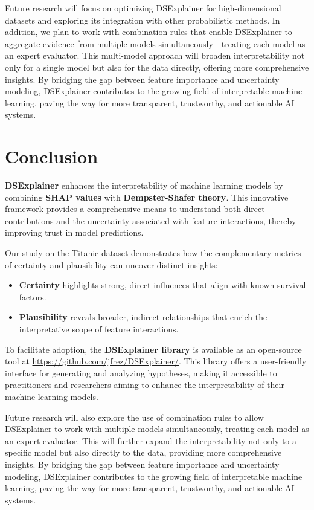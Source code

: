 \documentclass[acmlarge]{acmart}
\begin{document}
Future research will focus on optimizing DSExplainer for high-dimensional datasets and exploring its integration with other probabilistic methods. In addition, we plan to work with combination rules that enable DSExplainer to aggregate evidence from multiple models simultaneously—treating each model as an expert evaluator. This multi-model approach will broaden interpretability not only for a single model but also for the data directly, offering more comprehensive insights. By bridging the gap between feature importance and uncertainty modeling, DSExplainer contributes to the growing field of interpretable machine learning, paving the way for more transparent, trustworthy, and actionable AI systems.

\section{Conclusion}

\textbf{DSExplainer} enhances the interpretability of machine learning models by combining \textbf{SHAP values} with \textbf{Dempster-Shafer theory}. This innovative framework provides a comprehensive means to understand both direct contributions and the uncertainty associated with feature interactions, thereby improving trust in model predictions.

Our study on the Titanic dataset demonstrates how the complementary metrics of certainty and plausibility can uncover distinct insights:
\begin{itemize}
    \item \textbf{Certainty} highlights strong, direct influences that align with known survival factors.
    \item \textbf{Plausibility} reveals broader, indirect relationships that enrich the interpretative scope of feature interactions.
\end{itemize}

To facilitate adoption, the \textbf{DSExplainer library} is available as an open-source tool at \url{https://github.com/jfrez/DSExplainer/}. This library offers a user-friendly interface for generating and analyzing hypotheses, making it accessible to practitioners and researchers aiming to enhance the interpretability of their machine learning models.

Future research will also explore the use of combination rules to allow DSExplainer to work with multiple models simultaneously, treating each model as an expert evaluator. This will further expand the interpretability not only to a specific model but also directly to the data, providing more comprehensive insights. By bridging the gap between feature importance and uncertainty modeling, DSExplainer contributes to the growing field of interpretable machine learning, paving the way for more transparent, trustworthy, and actionable AI systems.



\end{document}
